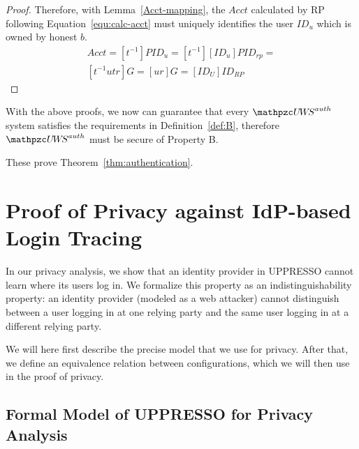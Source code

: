 \begin{proof}
    Therefore, with Lemma~\ref{Acct-mapping}, the $Acct$ calculated by RP following Equation~\ref{equ:calc-acct} must uniquely identifies the user $ID_u$ which is owned by honest $b$.  
    \oldc
    \begin{equation}\label{equ:calc-acct}
      \begin{split}
      Acct=[t^{-1}]PID_u=[t^{-1}][ID_u]PID_{rp}=\\
      [t^{-1}utr]G =[ur]G=[ID_U]ID_{RP}
      \end{split}
    \end{equation}
  \end{proof}

 
  With the above proofs, we now can guarantee that every 
  $\uppressoauthwebsystem$ system satisfies the requirements in 
  Definition~\ref{def:B}, therefore $\uppressoauthwebsystem$ 
  must be secure of Property B.
  
  These prove Theorem~\ref{thm:authentication}.\QED
  
  \section{Proof of Privacy against IdP-based Login Tracing}
  
  In our privacy analysis, we show that an identity provider in UPPRESSO cannot learn 
  where its users log in. We formalize this property as an indistinguishability 
  property: an identity provider (modeled as a web attacker) cannot distinguish 
  between a user logging in at one relying party and the same user logging in at 
  a different relying party.
  
  We will here first describe the precise model that we use for privacy.
  After that, we define an equivalence relation between configurations,
  which we will then use in the proof of privacy.
  
  \subsection{Formal Model of UPPRESSO for Privacy Analysis}
  
